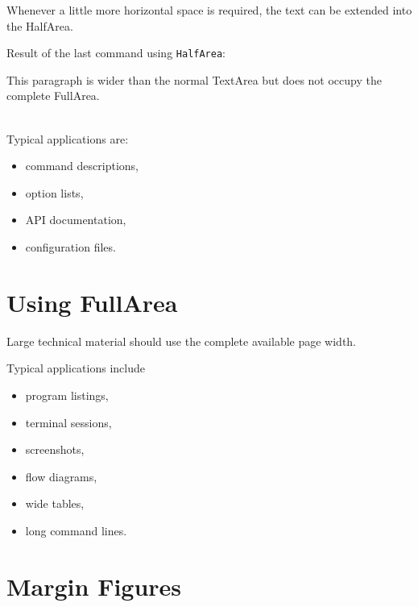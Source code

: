 \documentclass[
11pt,
a4paper,
oneside
]{scrbook}
\begin{document}
Whenever a little more horizontal space is required, the text can be extended
into the HalfArea.
\begin{HalfArea}




\end{HalfArea}
Result of the last command using \texttt{HalfArea}:
\begin{HalfArea}
	
	This paragraph is wider than the normal TextArea but does not occupy 
	the complete FullArea.
	
\end{HalfArea}
\ %
\\[1ex]
\noindent
Typical applications are:
\begin{itemize}
	\item command descriptions,
	\item option lists,
	\item API documentation,
	\item configuration files.
\end{itemize}


\section{Using FullArea}

Large technical material should use the complete available page width.
\begin{FullArea}




\end{FullArea}
Typical applications include
\begin{itemize}
	\item program listings,
	\item terminal sessions,
	\item screenshots,
	\item flow diagrams,
	\item wide tables,
	\item long command lines.
\end{itemize}


\section{Margin Figures}
\end{document}
